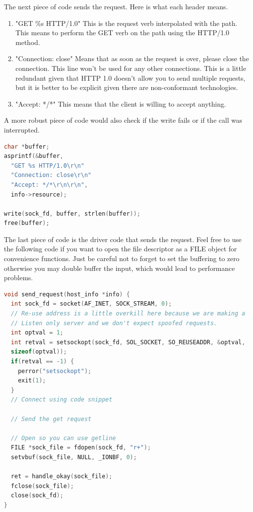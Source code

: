The next piece of code sends the request. Here is what each header means.

\begin{enumerate}
  \item "GET \%s HTTP/1.0" This is the request verb interpolated with the path. This means to perform the GET verb on the path using the HTTP/1.0 method.
  \item "Connection: close" Means that as soon as the request is over, please close the connection. This line won't be used for any other connections.
    This is a little redundant given that HTTP 1.0 doesn't allow you to send multiple requests, but it is better to be explicit given there are non-conformant technologies.
  \item "Accept: */*" This means that the client is willing to accept anything.
\end{enumerate}

A more robust piece of code would also check if the write fails or if the call was interrupted.

\begin{lstlisting}[language=C]
char *buffer;
asprintf(&buffer,
  "GET %s HTTP/1.0\r\n"
  "Connection: close\r\n"
  "Accept: */*\r\n\r\n",
  info->resource);

write(sock_fd, buffer, strlen(buffer));
free(buffer);
\end{lstlisting}

The last piece of code is the driver code that sends the request.
Feel free to use the following code if you want to open the file descriptor as a FILE object for convenience functions.
Just be careful not to forget to set the buffering to zero otherwise you may double buffer the input, which would lead to performance problems.

\begin{lstlisting}[language=C]
void send_request(host_info *info) {
  int sock_fd = socket(AF_INET, SOCK_STREAM, 0);
  // Re-use address is a little overkill here because we are making a
  // Listen only server and we don't expect spoofed requests.
  int optval = 1;
  int retval = setsockopt(sock_fd, SOL_SOCKET, SO_REUSEADDR, &optval,
  sizeof(optval));
  if(retval == -1) {
    perror("setsockopt");
    exit(1);
  }
  // Connect using code snippet

  // Send the get request

  // Open so you can use getline
  FILE *sock_file = fdopen(sock_fd, "r+");
  setvbuf(sock_file, NULL, _IONBF, 0);

  ret = handle_okay(sock_file);
  fclose(sock_file);
  close(sock_fd);
}
\end{lstlisting}

